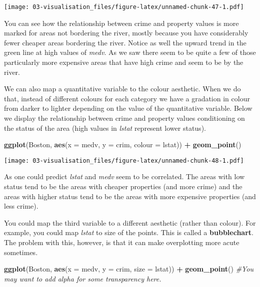 \documentclass[
]{book}
\newenvironment{Shaded}{\begin{snugshade}}{\end{snugshade}}
\newcommand{\AttributeTok}[1]{\textcolor[rgb]{0.13,0.29,0.53}{#1}}
\newcommand{\CommentTok}[1]{\textcolor[rgb]{0.56,0.35,0.01}{\textit{#1}}}
\newcommand{\FunctionTok}[1]{\textcolor[rgb]{0.13,0.29,0.53}{\textbf{#1}}}
\newcommand{\NormalTok}[1]{#1}
\newcommand{\SpecialCharTok}[1]{\textcolor[rgb]{0.81,0.36,0.00}{\textbf{#1}}}
\begin{document}
\texttt{[image: 03-visualisation\_files/figure-latex/unnamed-chunk-47-1.pdf]}

You can see how the relationship between crime and property values is more marked for areas not bordering the river, mostly because you have considerably fewer cheaper areas bordering the river. Notice as well the upward trend in the green line at high values of \emph{medv}. As we saw there seem to be quite a few of those particularly more expensive areas that have high crime and seem to be by the river.

We can also map a quantitative variable to the colour aesthetic. When we do that, instead of different colours for each category we have a gradation in colour from darker to lighter depending on the value of the quantitative variable. Below we display the relationship between crime and property values conditioning on the status of the area (high values in \emph{lstat} represent lower status).

\begin{Shaded}
\begin{Highlighting}[]
\FunctionTok{ggplot}\NormalTok{(Boston, }\FunctionTok{aes}\NormalTok{(}\AttributeTok{x =}\NormalTok{ medv, }\AttributeTok{y =}\NormalTok{ crim, }\AttributeTok{colour =}\NormalTok{ lstat)) }\SpecialCharTok{+}
  \FunctionTok{geom\_point}\NormalTok{() }
\end{Highlighting}
\end{Shaded}

\texttt{[image: 03-visualisation\_files/figure-latex/unnamed-chunk-48-1.pdf]}

As one could predict \emph{lstat} and \emph{medv} seem to be correlated. The areas with low status tend to be the areas with cheaper properties (and more crime) and the areas with higher status tend to be the areas with more expensive properties (and less crime).

You could map the third variable to a different aesthetic (rather than colour). For example, you could map \emph{lstat} to size of the points. This is called a \textbf{bubblechart}. The problem with this, however, is that it can make overplotting more acute sometimes.

\begin{Shaded}
\begin{Highlighting}[]
\FunctionTok{ggplot}\NormalTok{(Boston, }\FunctionTok{aes}\NormalTok{(}\AttributeTok{x =}\NormalTok{ medv, }\AttributeTok{y =}\NormalTok{ crim, }\AttributeTok{size =}\NormalTok{ lstat)) }\SpecialCharTok{+}
  \FunctionTok{geom\_point}\NormalTok{() }\CommentTok{\#You may want to add alpha for some transparency here.}
\end{Highlighting}
\end{Shaded}
\end{document}

